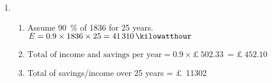 \documentclass[crop=false,parskip=half]{scrartcl} %
\begin{document}
\begin{solution}
\begin{enumerate} [label=\alph*)]
\item \begin{enumerate} [label=\roman*)]
\item Assume \SI{90}{\percent} of \SI{1836}{\kilowatthour} for 25 years.\\
$E=0.9\times 1836\times 25=\SI{41310}{\kilowatthour}$
\item $\text{Total of income and savings per year}=0.9\times \SI{502.33}[\pounds]{}=\SI{452.10}[\pounds]{}$
\item Total of savings/income over 25 years = \SI{11302}[\pounds]{}
\end{enumerate}
\end{enumerate}
\end{solution}


\end{document}
